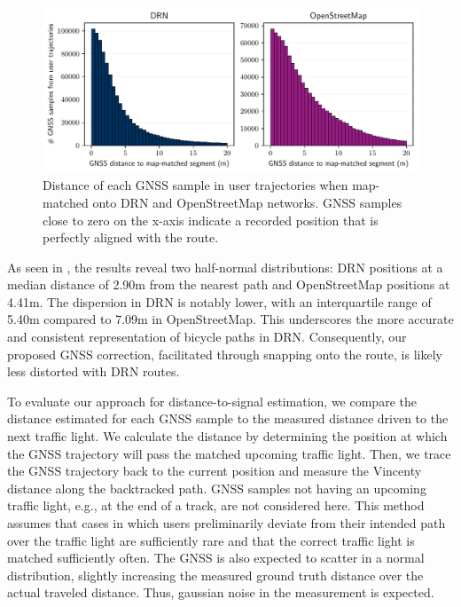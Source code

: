 \begin{figure}[t]
\centering 
\includegraphics[width=\linewidth]{images/routing-gnss-mapmatching-distribution.pdf}
\caption{Distance of each GNSS sample in user trajectories when map-matched onto DRN and OpenStreetMap networks. GNSS samples close to zero on the x-axis indicate a recorded position that is perfectly aligned with the route.}
\label{fig:routing-gnss-mapmatching-distribution}
\end{figure}

As seen in , the results reveal two half-normal distributions: DRN positions at a median distance of 2.90m from the nearest path and OpenStreetMap positions at 4.41m. The dispersion in DRN is notably lower, with an interquartile range of 5.40m compared to 7.09m in OpenStreetMap. This underscores the more accurate and consistent representation of bicycle paths in DRN. Consequently, our proposed GNSS correction, facilitated through snapping onto the route, is likely less distorted with DRN routes.

To evaluate our approach for distance-to-signal estimation, we compare the distance estimated for each GNSS sample to the measured distance driven to the next traffic light. We calculate the distance by determining the position at which the GNSS trajectory will pass the matched upcoming traffic light. Then, we trace the GNSS trajectory back to the current position and measure the Vincenty distance along the backtracked path. GNSS samples not having an upcoming traffic light, e.g., at the end of a track, are not considered here. This method assumes that cases in which users preliminarily deviate from their intended path over the traffic light are sufficiently rare and that the correct traffic light is matched sufficiently often. The GNSS is also expected to scatter in a normal distribution, slightly increasing the measured ground truth distance over the actual traveled distance. Thus, gaussian noise in the measurement is expected.

